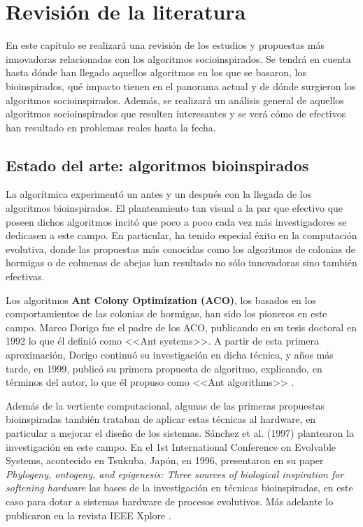 \chapter{Revisión de la literatura}

En este capítulo se realizará una revisión de los estudios y propuestas más innovadoras relacionadas con los algoritmos socioinspirados. Se tendrá en cuenta hasta dónde han llegado aquellos algoritmos en los que se basaron, los bioinspirados, qué impacto tienen en el panorama actual y de dónde surgieron los algoritmos socioinspirados. Además, se realizará un análisis general de aquellos algoritmos socioinspirados que resulten interesantes y se verá cómo de efectivos han resultado en problemas reales hasta la fecha.

\section{Estado del arte: algoritmos bioinspirados}

La algorítmica experimentó un antes y un después con la llegada de los algoritmos bioinspirados. El planteamiento tan visual a la par que efectivo que poseen dichos algoritmos incitó que poco a poco cada vez más investigadores se dedicasen a este campo. En particular, ha tenido especial éxito en la computación evolutiva, donde las propuestas más conocidas como los algoritmos de colonias de hormigas o de colmenas de abejas han resultado no sólo innovadoras sino también efectivas.

Los algoritmos \textbf{Ant Colony Optimization (ACO)}, los basados en los comportamientos de las colonias de hormigas, han sido los pioneros en este campo. Marco Dorigo fue el padre de los ACO, publicando en su tesis doctoral \cite{dorigo-thesis} en 1992 lo que él definió como <<Ant systems>>. A partir de esta primera aproximación, Dorigo continuó su investigación en dicha técnica, y años más tarde, en 1999, publicó su primera propuesta de algoritmo, explicando, en términos del autor, lo que él propuso como <<Ant algorithms>> \cite{ant-algorithms-dorigo}.

Además de la vertiente computacional, algunas de las primeras propuestas bioinspiradas también trataban de aplicar estas técnicas al hardware, en particular a mejorar el diseño de los sistemas. Sánchez et al. (1997) plantearon la investigación en este campo. En el 1st International Conference on Evolvable Systems, acontecido en Tsukuba, Japón, en 1996, presentaron en su paper \textit{Phylogeny, ontogeny, and epigenesis: Three sources of biological inspiration for softening hardware} \cite{bioinspired-systems-paper} las bases de la investigación en técnicas bioinspiradas, en este caso para dotar a sistemas hardware de procesos evolutivos. Más adelante lo publicaron en la revista IEEE Xplore \cite{bioinspired-systems-article}.


